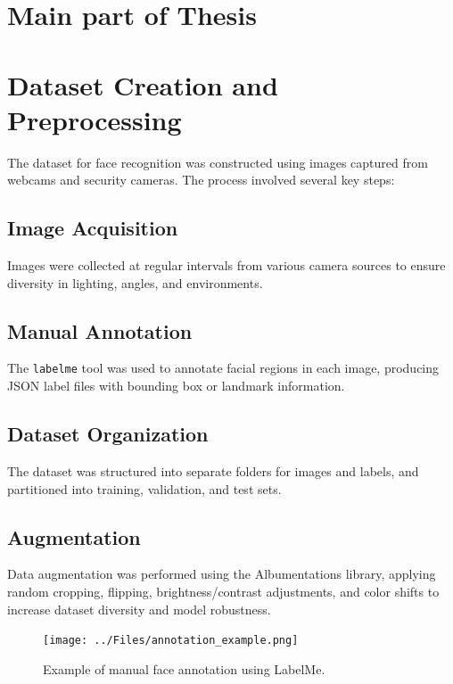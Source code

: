 \section{Main part of Thesis}


\section{Dataset Creation and Preprocessing}

The dataset for face recognition was constructed using images captured from webcams and security cameras. The process involved several key steps:

\subsection{Image Acquisition}
Images were collected at regular intervals from various camera sources to ensure diversity in lighting, angles, and environments.

\subsection{Manual Annotation}
The \texttt{labelme} tool was used to annotate facial regions in each image, producing JSON label files with bounding box or landmark information.

\subsection{Dataset Organization}
The dataset was structured into separate folders for images and labels, and partitioned into training, validation, and test sets.

\subsection{Augmentation}
Data augmentation was performed using the Albumentations library, applying random cropping, flipping, brightness/contrast adjustments, and color shifts to increase dataset diversity and model robustness.

\begin{figure}[ht!]
    \centering
    \texttt{[image: ../Files/annotation\_example.png]}
    \caption{Example of manual face annotation using LabelMe.}
    \label{fig:annotation-example}
\end{figure}

